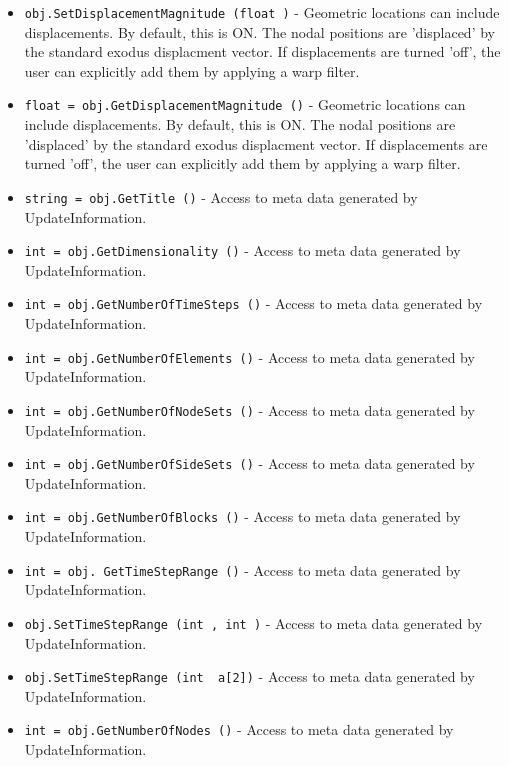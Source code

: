 \begin{itemize}
\item  \verb|obj.SetDisplacementMagnitude (float )| -  Geometric locations can include displacements.  By default, 
 this is ON.  The nodal positions are 'displaced' by the
 standard exodus displacment vector. If displacements
 are turned 'off', the user can explicitly add them by
 applying a warp filter.

\item  \verb|float = obj.GetDisplacementMagnitude ()| -  Geometric locations can include displacements.  By default, 
 this is ON.  The nodal positions are 'displaced' by the
 standard exodus displacment vector. If displacements
 are turned 'off', the user can explicitly add them by
 applying a warp filter.

\item  \verb|string = obj.GetTitle ()| -  Access to meta data generated by UpdateInformation.

\item  \verb|int = obj.GetDimensionality ()| -  Access to meta data generated by UpdateInformation.

\item  \verb|int = obj.GetNumberOfTimeSteps ()| -  Access to meta data generated by UpdateInformation.

\item  \verb|int = obj.GetNumberOfElements ()| -  Access to meta data generated by UpdateInformation.

\item  \verb|int = obj.GetNumberOfNodeSets ()| -  Access to meta data generated by UpdateInformation.

\item  \verb|int = obj.GetNumberOfSideSets ()| -  Access to meta data generated by UpdateInformation.

\item  \verb|int = obj.GetNumberOfBlocks ()| -  Access to meta data generated by UpdateInformation.

\item  \verb|int = obj. GetTimeStepRange ()| -  Access to meta data generated by UpdateInformation.

\item  \verb|obj.SetTimeStepRange (int , int )| -  Access to meta data generated by UpdateInformation.

\item  \verb|obj.SetTimeStepRange (int  a[2])| -  Access to meta data generated by UpdateInformation.

\item  \verb|int = obj.GetNumberOfNodes ()| -  Access to meta data generated by UpdateInformation.


\end{itemize}
